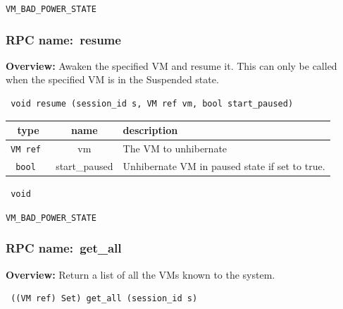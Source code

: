 \vspace{0.3cm}

 {\tt VM\_BAD\_POWER\_STATE}

\vspace{0.6cm}
\subsubsection{RPC name:~resume}

{\bf Overview:} 
Awaken the specified VM and resume it.  This can only be called when the
specified VM is in the Suspended state.

\begin{verbatim} void resume (session_id s, VM ref vm, bool start_paused)\end{verbatim}



 
\vspace{0.3cm}
\begin{tabular}{|c|c|p{7cm}|}
 \hline
{\bf type} & {\bf name} & {\bf description} \\ \hline
{\tt VM ref } & vm & The VM to unhibernate \\ \hline 

{\tt bool } & start\_paused & Unhibernate VM in paused state if set to true. \\ \hline 

\end{tabular}

\vspace{0.3cm}

{\tt 
void
}



\vspace{0.3cm}

 {\tt VM\_BAD\_POWER\_STATE}

\vspace{0.6cm}
\subsubsection{RPC name:~get\_all}

{\bf Overview:} 
Return a list of all the VMs known to the system.

\begin{verbatim} ((VM ref) Set) get_all (session_id s)\end{verbatim}


